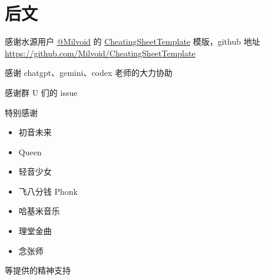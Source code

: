 \section{后文}

感谢水源用户 \href{https://shuiyuan.sjtu.edu.cn/u/milvoid/summary}{@Milvoid} 的 \href{https://shuiyuan.sjtu.edu.cn/t/topic/471743}{CheatingSheetTemplate} 模版，github 地址 \url{https://github.com/Milvoid/CheatingSheetTemplate}

感谢 chatgpt、gemini、codex 老师的大力协助

感谢群 U 们的 issue

特别感谢

\begin{itemize}
    \item 初音未来
    \item Queen
    \item 轻音少女
    \item 飞八分钱 Phonk
    \item 哈基米音乐
    \item 理堂金曲
    \item 念张师
\end{itemize}

等提供的精神支持